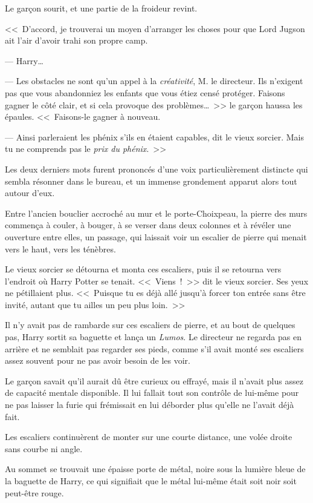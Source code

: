 Le garçon sourit, et une partie de la froideur revint.

<<~D'accord, je trouverai un moyen d'arranger les choses pour que Lord Jugson ait l'air d'avoir trahi son propre camp.

--- Harry…

--- Les obstacles ne sont qu'un appel à la \emph{créativité}, M. le directeur. Ils n'exigent pas que vous abandonniez les enfants que vous étiez censé protéger. Faisons gagner le côté clair, et si cela provoque des problèmes…~>> le garçon haussa les épaules. <<~Faisons-le gagner à nouveau.

--- Ainsi parleraient les phénix s'ils en étaient capables, dit le vieux sorcier. Mais tu ne comprends pas le \emph{prix du phénix}.~>>

Les deux derniers mots furent prononcés d'une voix particulièrement distincte qui sembla résonner dans le bureau, et un immense grondement apparut alors tout autour d'eux.

Entre l'ancien bouclier accroché au mur et le porte-Choixpeau, la pierre des murs commença à couler, à bouger, à se verser dans deux colonnes et à révéler une ouverture entre elles, un passage, qui laissait voir un escalier de pierre qui menait vers le haut, vers les ténèbres.

Le vieux sorcier se détourna et monta ces escaliers, puis il se retourna vers l'endroit où Harry Potter se tenait. <<~Viens~!~>> dit le vieux sorcier. Ses yeux ne pétillaient plus. <<~Puisque tu es déjà allé jusqu'à forcer ton entrée sans être invité, autant que tu ailles un peu plus loin.~>>

\later

Il n'y avait pas de rambarde sur ces escaliers de pierre, et au bout de quelques pas, Harry sortit sa baguette et lança un \emph{Lumos}. Le directeur ne regarda pas en arrière et ne semblait pas regarder ses pieds, comme s'il avait monté ses escaliers assez souvent pour ne pas avoir besoin de les voir.

Le garçon savait qu'il aurait dû être curieux ou effrayé, mais il n'avait plus assez de capacité mentale disponible. Il lui fallait tout son contrôle de lui-même pour ne pas laisser la furie qui frémissait en lui déborder plus qu'elle ne l'avait déjà fait.

Les escaliers continuèrent de monter sur une courte distance, une volée droite sans courbe ni angle.

Au sommet se trouvait une épaisse porte de métal, noire sous la lumière bleue de la baguette de Harry, ce qui signifiait que le métal lui-même était soit noir soit peut-être rouge.

